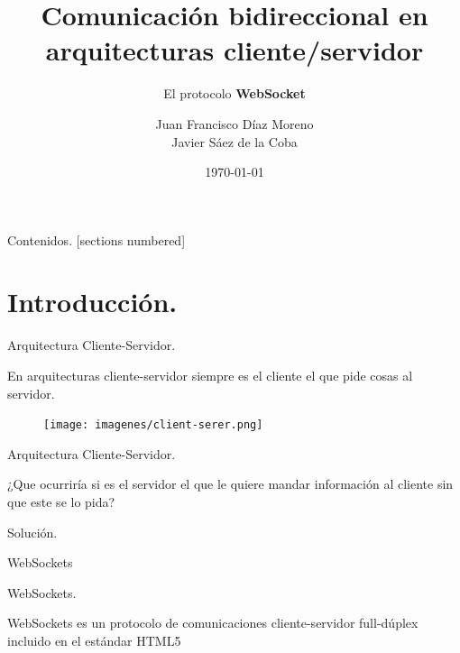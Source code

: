 \documentclass[usenames,dvipsnames]{beamer}
\title{Comunicación bidireccional en arquitecturas cliente/servidor}
\subtitle{El protocolo \textbf{WebSocket}}
\date{\today}
\institute{Universidad de Granada}
\author{Juan Francisco Díaz Moreno \\ Javier Sáez de la Coba}
\begin{document}
\maketitle
\begin{frame}{Contenidos.}
  [sections numbered]
  \tableofcontents [hideallsubsections]
\end{frame}

\section{Introducción. }
\begin{frame}{Arquitectura Cliente-Servidor. }

En arquitecturas cliente-servidor siempre es el cliente el que pide cosas al servidor.
\begin{figure}[H]

	\begin{center}
	\texttt{[image: imagenes/client-serer.png]}
	\end{center}
	
\end{figure}

\end{frame}

\begin{frame}{Arquitectura Cliente-Servidor. }

¿Que ocurriría si es el servidor el que le quiere mandar información al cliente sin que este se lo pida?

\end{frame}

\begin{frame}{Solución. }

\begin{center}\huge{WebSockets}\end{center}

\end{frame}

\begin{frame}{WebSockets. }

WebSockets es un protocolo de comunicaciones cliente-servidor full-dúplex incluido en el estándar HTML5

\end{frame}
\end{document}
